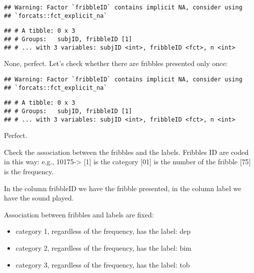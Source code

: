\documentclass[
]{article}
\newenvironment{Shaded}{\begin{snugshade}}{\end{snugshade}}
\newcommand{\DecValTok}[1]{\textcolor[rgb]{0.00,0.00,0.81}{#1}}
\newcommand{\KeywordTok}[1]{\textcolor[rgb]{0.13,0.29,0.53}{\textbf{#1}}}
\newcommand{\NormalTok}[1]{#1}
\newcommand{\OperatorTok}[1]{\textcolor[rgb]{0.81,0.36,0.00}{\textbf{#1}}}
\newcommand{\StringTok}[1]{\textcolor[rgb]{0.31,0.60,0.02}{#1}}
\begin{document}
\begin{verbatim}
## Warning: Factor `fribbleID` contains implicit NA, consider using
## `forcats::fct_explicit_na`
\end{verbatim}

\begin{verbatim}
## # A tibble: 0 x 3
## # Groups:   subjID, fribbleID [1]
## # ... with 3 variables: subjID <int>, fribbleID <fct>, n <int>
\end{verbatim}

None, perfect. Let's check whether there are fribbles presented only
once:

\begin{Shaded}
\end{Shaded}

\begin{verbatim}
## Warning: Factor `fribbleID` contains implicit NA, consider using
## `forcats::fct_explicit_na`
\end{verbatim}

\begin{verbatim}
## # A tibble: 0 x 3
## # Groups:   subjID, fribbleID [1]
## # ... with 3 variables: subjID <int>, fribbleID <fct>, n <int>
\end{verbatim}

Perfect.

Check the association between the fribbles and the labels. Fribbles ID
are coded in this way: e.g., 10175-\textgreater{} {[}1{]} is the
category {[}01{]} is the number of the fribble {[}75{]} is the
frequency.

In the column fribbleID we have the fribble presented, in the column
label we have the sound played.

Association between fribbles and labels are fixed:

\begin{itemize}
\item
  category 1, regardless of the frequency, has the label: dep
\item
  category 2, regardless of the frequency, has the label: bim
\item
  category 3, regardless of the frequency, has the label: tob
\end{itemize}
\end{document}

